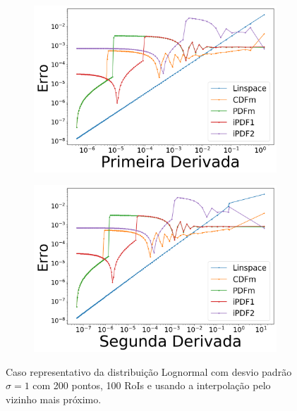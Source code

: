 \begin{figure}[H]
	\begin{subfigure}[b]{0.45\textwidth}
		\centering 
		\includegraphics[width=\textwidth]{./figuras/error_lognormal_nearest_Primeira_Derivada_1.png}
		\caption{}
		\label{fig:error_log_near_deriv}
	\end{subfigure}
	\hfill
	\begin{subfigure}[b]{0.45\textwidth}
		\centering 
		\includegraphics[width=\textwidth]{./figuras/error_lognormal_nearest_Segunda_Derivada_1.png}
		\caption{}
		\label{fig:error_log_near_deriv2}
	\end{subfigure}
	\caption{Caso representativo da distribuição Lognormal com desvio padrão $ \sigma = 1 $ com 200 pontos, 100 RoIs e usando a interpolação pelo vizinho mais próximo.}
	\label{fig:error_lognormal_nearest}
\end{figure}



